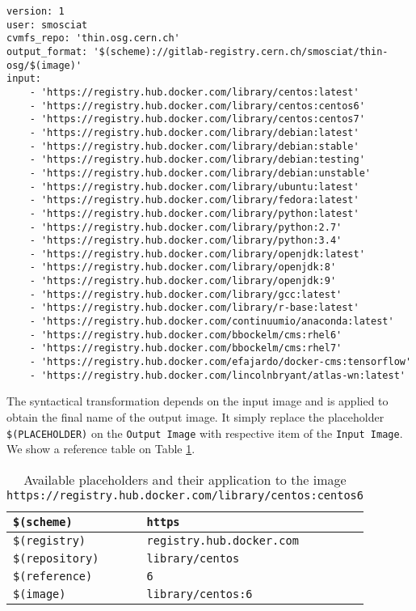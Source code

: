 \begin{minipage}{\linewidth}
\begin{lstlisting}[caption={Example of a small \textit{wish-list}},label={lst:wish-list}]
version: 1
user: smosciat
cvmfs_repo: 'thin.osg.cern.ch'
output_format: '$(scheme)://gitlab-registry.cern.ch/smosciat/thin-osg/$(image)'
input:
    - 'https://registry.hub.docker.com/library/centos:latest'
    - 'https://registry.hub.docker.com/library/centos:centos6'
    - 'https://registry.hub.docker.com/library/centos:centos7'
    - 'https://registry.hub.docker.com/library/debian:latest'
    - 'https://registry.hub.docker.com/library/debian:stable'
    - 'https://registry.hub.docker.com/library/debian:testing'
    - 'https://registry.hub.docker.com/library/debian:unstable'
    - 'https://registry.hub.docker.com/library/ubuntu:latest'
    - 'https://registry.hub.docker.com/library/fedora:latest'
    - 'https://registry.hub.docker.com/library/python:latest'
    - 'https://registry.hub.docker.com/library/python:2.7'
    - 'https://registry.hub.docker.com/library/python:3.4'
    - 'https://registry.hub.docker.com/library/openjdk:latest'
    - 'https://registry.hub.docker.com/library/openjdk:8'
    - 'https://registry.hub.docker.com/library/openjdk:9'
    - 'https://registry.hub.docker.com/library/gcc:latest'
    - 'https://registry.hub.docker.com/library/r-base:latest'
    - 'https://registry.hub.docker.com/continuumio/anaconda:latest'
    - 'https://registry.hub.docker.com/bbockelm/cms:rhel6'
    - 'https://registry.hub.docker.com/bbockelm/cms:rhel7'
    - 'https://registry.hub.docker.com/efajardo/docker-cms:tensorflow'
    - 'https://registry.hub.docker.com/lincolnbryant/atlas-wn:latest'
\end{lstlisting}
\end{minipage}

The syntactical transformation depends on the input image and is applied to
obtain the final name of the output image. It simply replace the placeholder
\texttt{\$(PLACEHOLDER)} on the \texttt{Output Image}  with respective item of
the \texttt{Input Image}. We show a reference table on Table \ref{table:placeholder}.

\begin{table}
\centering
\begin{tabular}{l|l} 
\toprule
    \texttt{\$(scheme)}     & \texttt{https}                    \\ 
\hline
    \texttt{\$(registry)}   & \texttt{registry.hub.docker.com}  \\ 
\hline
    \texttt{\$(repository)} & \texttt{library/centos}           \\ 
\hline
    \texttt{\$(reference)}  & \texttt{6}                        \\ 
\hline
    \texttt{\$(image)}      & \texttt{library/centos:6}         \\
\bottomrule
\end{tabular}
    \caption{Available placeholders and their application to the image \texttt{https://registry.hub.docker.com/library/centos:centos6}}
\label{table:placeholder}
\end{table}

